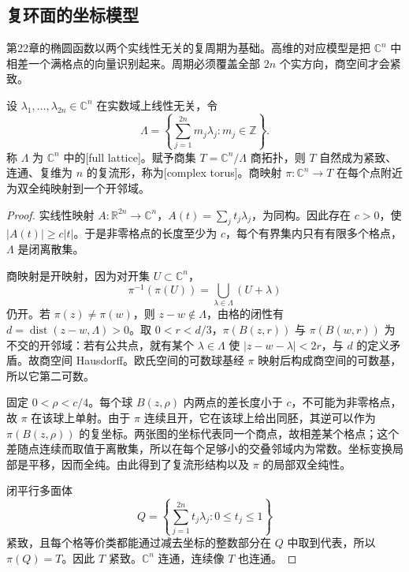 \subsection{复环面的坐标模型}
\label{b3:subsec:290703}

第22章的椭圆函数以两个实线性无关的复周期为基础。高维的对应模型是把 \(\mathbb C^n\) 中相差一个满格点的向量识别起来。周期必须覆盖全部 \(2n\) 个实方向，商空间才会紧致。

\begin{proposition}[满格商与复环面]\label{b3:prop:29-complex-torus}
设 \(\lambda_1,\ldots,\lambda_{2n}\in\mathbb C^n\) 在实数域上线性无关，令
\[
 \Lambda=\left\{\sum_{j=1}^{2n}m_j\lambda_j:m_j\in\mathbb Z\right\}.
\]
称 \(\Lambda\) 为 \(\mathbb C^n\) 中的[full lattice]。赋予商集 \(T=\mathbb C^n/\Lambda\) 商拓扑，则 \(T\) 自然成为紧致、连通、复维为 \(n\) 的复流形，称为[complex torus]。商映射 \(\pi:\mathbb C^n\to T\) 在每个点附近为双全纯映射到一个开邻域。
\end{proposition}
\begin{proof}
实线性映射 \(A:\mathbb R^{2n}\to\mathbb C^n\)，\(A(t)=\sum_jt_j\lambda_j\)，为同构。因此存在 \(c>0\)，使 \(|A(t)|\ge c|t|\)。于是非零格点的长度至少为 \(c\)，每个有界集内只有有限多个格点，\(\Lambda\) 是闭离散集。

商映射是开映射，因为对开集 \(U\subset\mathbb C^n\)，
\[
 \pi^{-1}(\pi(U))=\bigcup_{\lambda\in\Lambda}(U+\lambda)
\]
仍开。若 \(\pi(z)\ne\pi(w)\)，则 \(z-w\notin\Lambda\)，由格的闭性有 \(d=\operatorname{dist}(z-w,\Lambda)>0\)。取 \(0<r<d/3\)，\(\pi(B(z,r))\) 与 \(\pi(B(w,r))\) 为不交的开邻域：若有公共点，就有某个 \(\lambda\in\Lambda\) 使 \(|z-w-\lambda|<2r\)，与 \(d\) 的定义矛盾。故商空间 Hausdorff。欧氏空间的可数球基经 \(\pi\) 映射后构成商空间的可数基，所以它第二可数。

固定 \(0<\rho<c/4\)。每个球 \(B(z,\rho)\) 内两点的差长度小于 \(c\)，不可能为非零格点，故 \(\pi\) 在该球上单射。由于 \(\pi\) 连续且开，它在该球上给出同胚，其逆可以作为 \(\pi(B(z,\rho))\) 的复坐标。两张图的坐标代表同一个商点，故相差某个格点；这个差随点连续而取值于离散集，所以在每个足够小的交叠邻域内为常数。坐标变换局部是平移，因而全纯。由此得到了复流形结构以及 \(\pi\) 的局部双全纯性。

闭平行多面体
\[
 Q=\left\{\sum_{j=1}^{2n}t_j\lambda_j:0\le t_j\le1\right\}
\]
紧致，且每个格等价类都能通过减去坐标的整数部分在 \(Q\) 中取到代表，所以 \(\pi(Q)=T\)。因此 \(T\) 紧致。\(\mathbb C^n\) 连通，连续像 \(T\) 也连通。
\end{proof}

